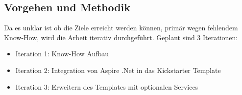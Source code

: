     \subsection{Vorgehen und Methodik}
        Da es unklar ist ob die Ziele erreicht werden können, primär wegen fehlendem Know-How, wird die Arbeit iterativ durchgeführt. Geplant sind 3 Iterationen:
        \begin{itemize}
            \item Iteration 1: Know-How Aufbau
            \item Iteration 2: Integration von Aspire .Net in das Kickstarter Template
            \item Iteration 3: Erweitern des Templates mit optionalen Services
        \end{itemize}
